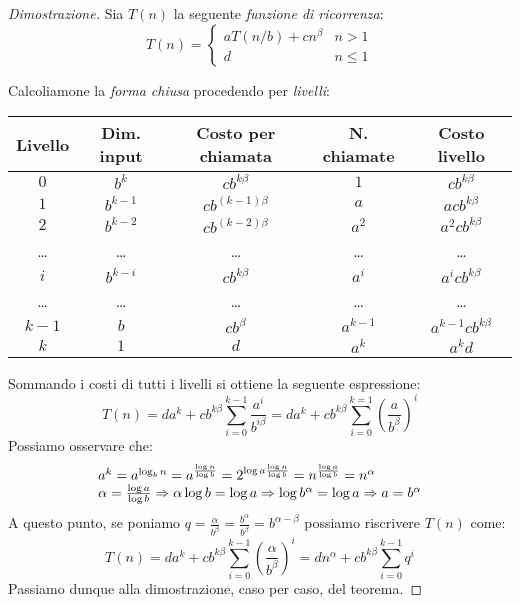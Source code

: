 \begin{proof}[Dimostrazione]
    Sia $T(n)$ la seguente \emph{funzione di ricorrenza}:
    \[T(n)=\begin{cases}
        aT(n/b)+cn^\beta & n>1\\
        d & n\leq1
    \end{cases}\]
    
    \bigskip\noindent
    Calcoliamone la \emph{forma chiusa} procedendo per \emph{livelli}:

    \begin{table}[h!]
        \renewcommand{\arraystretch}{1.2}
        \centering
        \begin{tabular}{|c|c|c|c|c|}
            \hline
            \textbf{Livello} & \textbf{Dim. input} & \textbf{Costo per chiamata} & \textbf{N. chiamate} & \textbf{Costo livello}\\
            \hline
            $0$ & $b^k$ & $c b^{k\beta}$ & $1$ & $c b^{k\beta}$\\
            \hline
            $1$ & $b^{k-1}$ & $c b^{(k-1)\beta}$ & $a$ & $a c b^{k\beta}$\\
            \hline
            $2$ & $b^{k-2}$ & $c b^{(k-2)\beta}$ & $a^2$ & $a^2 c b^{k\beta}$\\
            \hline
            \dots & \dots & \dots & \dots & \dots\\
            \hline
            $i$ & $b^{k-i}$ & $c b^{k\beta}$ & $a^i$ & $a^i c b^{k\beta}$\\
            \hline
            \dots & \dots & \dots & \dots & \dots\\
            \hline
            $k-1$ & $b$ & $c b^\beta$ & $a^{k-1}$ & $a^{k-1} c b^{k\beta}$\\
            \hline
            $k$ & $1$ & $d$ & $a^k$ & $a^kd$\\
            \hline
        \end{tabular}
    \end{table}\noindent
    Sommando i costi di tutti i livelli si ottiene la seguente espressione:
    \[T(n)=da^k+cb^{k\beta}\sum_{i=0}^{k-1}\frac{a^i}{b^{i\beta}}=da^k+cb^{k\beta}
    \sum_{i=0}^{k=1}\left(\frac{a}{b^\beta}\right)^i\]
    Possiamo osservare che:
    \[\begin{array}[t]{l}
        a^k=a^{\log_bn}=a^{\frac{\log n}{\log b}}=2^{\log a\frac{\log n}{\log b}}
    =n^{\frac{\log a}{\log b}}=n^\alpha\\
        \alpha=\frac{\log a}{\log b}\Rightarrow\alpha\log b=\log a\Rightarrow
    \log b^\alpha=\log a\Rightarrow a=b^\alpha        
    \end{array}\]
    A questo punto, se poniamo $q=\frac{\alpha}{b^\beta}=\frac{b^\alpha}{b^\beta}
    =b^{\alpha-\beta}$ possiamo riscrivere $T(n)$ come:
    \[T(n)=da^k+cb^{k\beta}\sum_{i=0}^{k-1}\left(\frac{\alpha}{b^\beta}\right)^i
    =dn^\alpha+cb^{k\beta}\sum_{i=0}^{k-1}q^i\]
    Passiamo dunque alla dimostrazione, caso per caso, del teorema.

\end{proof}

